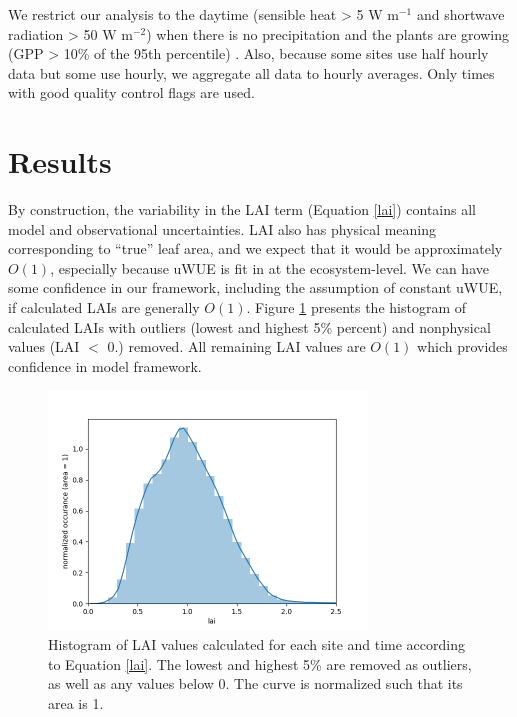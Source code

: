 \documentclass[draft,linenumbers]{agujournal}
\begin{document}
We restrict our analysis to the daytime (sensible heat > 5 W m$^{-1}$ and shortwave radiation > 50 W m$^{-2}$) when there is no precipitation and the plants are growing (GPP > 10\% of the 95th percentile) . Also, because some sites use half hourly data but some use hourly, we aggregate all data to hourly averages. Only times with good quality control flags are used.

\section{Results}
\label{results}

By construction, the variability in the LAI term (Equation \ref{lai}) contains all model and observational uncertainties. LAI also has physical meaning corresponding to ``true'' leaf area, and we expect that it would be approximately $O(1)$, especially because uWUE is fit in \citet{Zhou_2015} at the ecosystem-level. We can have some confidence in our framework, including the assumption of constant uWUE, if calculated LAIs are generally $O(1)$. Figure \ref{lai_fig} presents the histogram of calculated LAIs with outliers (lowest and highest 5\% percent) and nonphysical values (LAI $<$ 0.) removed. All remaining LAI values are $O(1)$ which provides confidence in model framework.

\begin{figure}[h]
\centering
\includegraphics[width=20pc]{./fig02.png}
\caption{Histogram of LAI values calculated for each site and time according to Equation \ref{lai}. The lowest and highest 5\% are removed as outliers, as well as any values below 0. The curve is normalized such that its area is 1. }
\label{lai_fig}
\end{figure}
\end{document}
